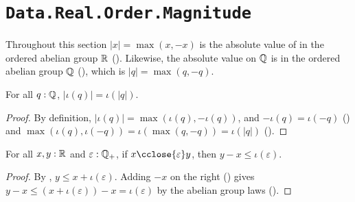 \section{\texttt{Data.Real.Order.Magnitude}}

Throughout this section $\lvert x \rvert = \max(x, -x)$ is the absolute value of  in the ordered abelian group $\mathbb{R}$ (). Likewise, the absolute value on $\mathbb{Q}$ is  in the ordered abelian group $\mathbb{Q}$ (), which is $\lvert q \rvert = \max(q, -q)$.

\begin{lemma}
  \label{absRatReal}
  For all $q : \mathbb{Q}$, $\lvert \iota(q) \rvert = \iota(\lvert q \rvert)$.
\end{lemma}
\begin{proof}
  By definition, $\lvert \iota(q) \rvert = \max(\iota(q), -\iota(q))$, and $-\iota(q) = \iota(-q)$ () and $\max(\iota(q), \iota(-q)) = \iota(\max(q, -q)) = \iota(\lvert q \rvert)$ ().
\end{proof}

\begin{corollary}
  \label{closeDeltaLeRatReal}
  For all $x, y : \mathbb{R}$ and $\varepsilon : \mathbb{Q}_{+}$, if $x \cclose{\varepsilon} y$, then $y - x \le \iota(\varepsilon)$.
\end{corollary}
\begin{proof}
  By , $y \le x + \iota(\varepsilon)$. Adding $-x$ on the right () gives $y - x \le (x + \iota(\varepsilon)) - x = \iota(\varepsilon)$ by the abelian group laws ().
\end{proof}

